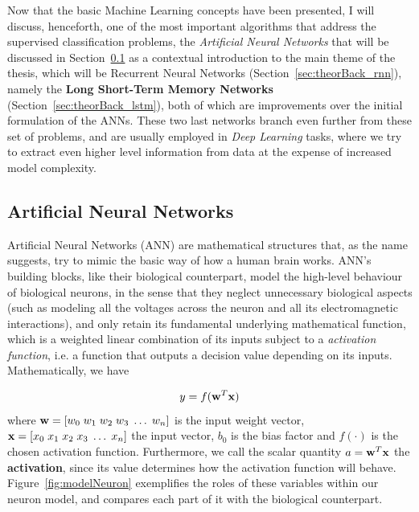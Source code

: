 Now that the basic Machine Learning concepts have been presented, I will discuss, henceforth, one of the most important algorithms that address the supervised classification problems, the \emph{Artificial Neural Networks} that will be discussed in Section~\ref{sec:theorBack_ann} as a contextual introduction to the main theme of the thesis, which will be Recurrent Neural Networks (Section~\ref{sec:theorBack_rnn}), namely the \textbf{Long Short-Term Memory Networks} (Section~\ref{sec:theorBack_lstm}), both of which are improvements over the initial formulation of the ANNs. These two last networks branch even further from these set of problems, and are usually employed in \textit{Deep Learning} tasks, where we try to extract even higher level information from data at the expense of increased model complexity. 

\subsection{Artificial Neural Networks}\label{sec:theorBack_ann}

Artificial Neural Networks (ANN) are mathematical structures that, as the name suggests, try to mimic the basic way of how a human brain works. ANN's building blocks, like their biological counterpart, model the high-level behaviour of biological neurons, in the sense that they neglect unnecessary biological aspects (such as modeling all the voltages across the neuron and all its electromagnetic interactions), and only retain its fundamental underlying mathematical function, which is a weighted linear combination of its inputs subject to a \emph{activation function}, i.e. a function that outputs a decision value depending on its inputs.  Mathematically, we have

\begin{equation}
	y = f(\mathbf{w}^T \mathbf{x})
\end{equation}
where $\mathbf{w} = \left[ w_0 \; w_1 \; w_2 \;  w_3 \;  \dots \; w_n \right]$ is the input weight vector, $\mathbf{x} = \left[ x_0 \; x_1 \; x_2 \; x_3 \; \dots \; x_n \right]$ the input vector, $b_0$ is the bias factor and $f(\cdot)$ is the chosen activation function. Furthermore, we call the scalar quantity $a = \mathbf{w}^T \mathbf{x}$ the \textbf{activation}, since its value determines how the activation function will behave. Figure~\ref{fig:modelNeuron} exemplifies the roles of these variables within our neuron model, and compares each part of it with the biological counterpart.

